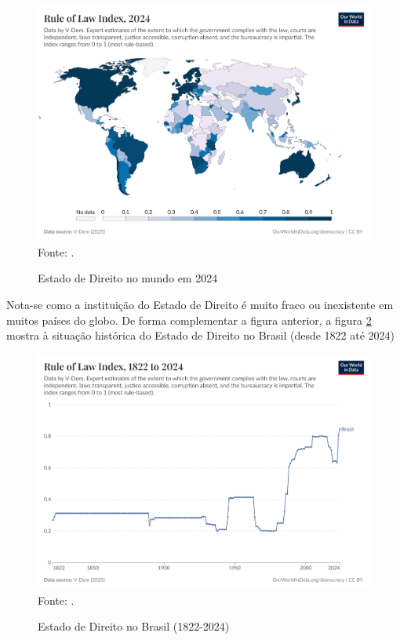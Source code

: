 \begin{figure}[H]
	\centering
	\caption{Estado de Direito no mundo em 2024}
	\includegraphics[width=1\linewidth]{figuras/rule-of-law-index}
	\label{fig:rule-of-law-index}
	\footnotesize{Fonte: \cite{rule-of-law-index}.}
\end{figure}

Nota-se como a instituição do Estado de Direito é muito fraco ou inexistente em muitos países do globo. De forma complementar a figura anterior, a figura \ref{fig:rule-of-law-index-brazil} mostra à situação histórica do Estado de Direito no Brasil (desde 1822 até 2024)

\begin{figure}[H]
	\centering
	\caption{Estado de Direito no Brasil (1822-2024)}
	\includegraphics[width=1\linewidth]{figuras/rule-of-law-index-brazil}
	\label{fig:rule-of-law-index-brazil}
	\footnotesize{Fonte: \cite{rule-of-law-index}.}
\end{figure}

